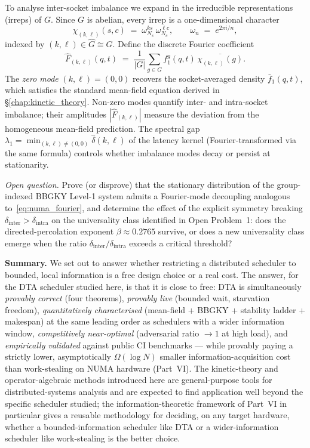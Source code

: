 \documentclass[11pt,a4paper]{article}
\begin{document}
To analyse inter-socket imbalance we expand in the irreducible
representations (irreps) of $G$.  Since $G$ is abelian, every irrep is a
one-dimensional character
\[
  \chi_{(k,\ell)}(s,c) \;=\; \omega_{N_s}^{ks}\,\omega_{N_c}^{\ell c},
  \qquad
  \omega_n \;=\; e^{2\pi i/n},
\]
indexed by $(k,\ell) \in \hat G \cong G$.  Define the discrete Fourier
coefficient
\begin{equation}\label{eq:numa_fourier}
  \hat{F}_{(k,\ell)}(q,t)
  \;=\;
  \frac{1}{|G|}\sum_{g \in G} f_1^g(q,t)\,\overline{\chi_{(k,\ell)}(g)}.
\end{equation}
The \emph{zero mode} $(k,\ell) = (0,0)$ recovers the socket-averaged density
$\bar f_1(q,t)$, which satisfies the standard mean-field equation derived in
\S\ref{chap:kinetic_theory}.  Non-zero modes quantify inter- and intra-socket imbalance;
their amplitudes $|\hat{F}_{(k,\ell)}|$ measure the deviation from the
homogeneous mean-field prediction.  The spectral gap
$\lambda_1 = \min_{(k,\ell)\neq(0,0)} \hat\delta(k,\ell)$
of the latency kernel (Fourier-transformed via the same formula) controls
whether imbalance modes decay or persist at stationarity.

\medskip
\noindent\textit{Open question.}
Prove (or disprove) that the stationary distribution of the group-indexed
BBGKY Level-1 system admits a Fourier-mode decoupling analogous
to~\eqref{eq:numa_fourier}, and determine the effect of the explicit
symmetry breaking $\delta_{\mathrm{inter}} > \delta_{\mathrm{intra}}$ on
the universality class identified in Open Problem~1: does the directed-percolation
exponent $\beta \approx 0.2765$ survive, or does a new universality class
emerge when the ratio $\delta_{\mathrm{inter}}/\delta_{\mathrm{intra}}$
exceeds a critical threshold?



\bigskip
\noindent\textbf{Summary.}
We set out to answer whether restricting a distributed scheduler to
bounded, local information is a free design choice or a real cost. The
answer, for the DTA scheduler studied here, is that it is close to free:
DTA is simultaneously \emph{provably correct} (four theorems), \emph{provably
live} (bounded wait, starvation freedom), \emph{quantitatively
characterised} (mean-field + BBGKY + stability ladder + makespan) at the
same leading order as schedulers with a wider information window,
\emph{competitively near-optimal} (adversarial ratio $\to 1$ at high load),
and \emph{empirically validated} against public CI benchmarks --- while
provably paying a strictly lower, asymptotically $\Omega(\log N)$ smaller
information-acquisition cost than work-stealing on NUMA hardware
(Part~VI). The kinetic-theory and operator-algebraic methods introduced
here are general-purpose tools for distributed-systems analysis and are
expected to find application well beyond the specific scheduler studied;
the information-theoretic framework of Part~VI in particular gives a
reusable methodology for deciding, on any target hardware, whether a
bounded-information scheduler like DTA or a wider-information scheduler
like work-stealing is the better choice.
\end{document}
